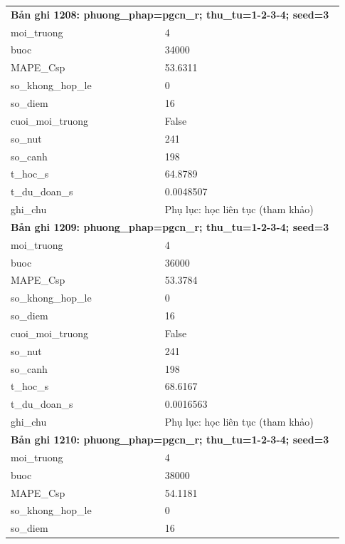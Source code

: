 \begin{longtable}{p{0.43\linewidth}p{0.50\linewidth}}
\midrule
\multicolumn{2}{p{0.95\linewidth}}{\textbf{Bản ghi 1208: phuong\_phap=pgcn\_r; thu\_tu=1-2-3-4; seed=3}} \\
moi\_\allowbreak truong & 4 \\
buoc & 34000 \\
MAPE\_\allowbreak Csp & 53.6311 \\
so\_\allowbreak khong\_\allowbreak hop\_\allowbreak le & 0 \\
so\_\allowbreak diem & 16 \\
cuoi\_\allowbreak moi\_\allowbreak truong & False \\
so\_\allowbreak nut & 241 \\
so\_\allowbreak canh & 198 \\
t\_\allowbreak hoc\_\allowbreak s & 64.8789 \\
t\_\allowbreak du\_\allowbreak doan\_\allowbreak s & 0.0048507 \\
ghi\_\allowbreak chu & Phụ lục: học liên tục (tham khảo) \\
\midrule
\multicolumn{2}{p{0.95\linewidth}}{\textbf{Bản ghi 1209: phuong\_phap=pgcn\_r; thu\_tu=1-2-3-4; seed=3}} \\
moi\_\allowbreak truong & 4 \\
buoc & 36000 \\
MAPE\_\allowbreak Csp & 53.3784 \\
so\_\allowbreak khong\_\allowbreak hop\_\allowbreak le & 0 \\
so\_\allowbreak diem & 16 \\
cuoi\_\allowbreak moi\_\allowbreak truong & False \\
so\_\allowbreak nut & 241 \\
so\_\allowbreak canh & 198 \\
t\_\allowbreak hoc\_\allowbreak s & 68.6167 \\
t\_\allowbreak du\_\allowbreak doan\_\allowbreak s & 0.0016563 \\
ghi\_\allowbreak chu & Phụ lục: học liên tục (tham khảo) \\
\midrule
\multicolumn{2}{p{0.95\linewidth}}{\textbf{Bản ghi 1210: phuong\_phap=pgcn\_r; thu\_tu=1-2-3-4; seed=3}} \\
moi\_\allowbreak truong & 4 \\
buoc & 38000 \\
MAPE\_\allowbreak Csp & 54.1181 \\
so\_\allowbreak khong\_\allowbreak hop\_\allowbreak le & 0 \\
so\_\allowbreak diem & 16 \\

\end{longtable}
